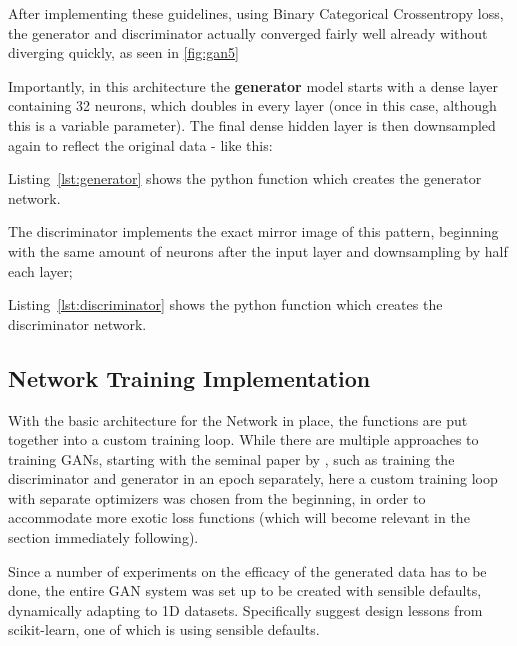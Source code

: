 \clearpage

After implementing these guidelines, using Binary Categorical Crossentropy loss, the generator and discriminator actually converged fairly well already without diverging quickly, as seen in \ref{fig:gan5}


Importantly, in this architecture the \textbf{generator} model starts with a dense layer containing 32 neurons, which doubles in every layer (once in this case, although this is a variable parameter). The final dense hidden layer is then downsampled again to reflect the original data - like this:


Listing~\ref{lst:generator} shows the python function which creates the generator network.

\pagebreak 

The discriminator implements the exact mirror image of this pattern, beginning with the same amount of neurons after the input layer and downsampling by half each layer; 


Listing~\ref{lst:discriminator} shows the python function which creates the discriminator network.

\pagebreak 

\subsection{Network Training Implementation}
\label{subsection:training_loop}

With the basic architecture for the Network in place, the functions are put together into a custom training loop. While there are multiple approaches to training \acp{GAN}, starting with the seminal paper by \cite{goodfellow2014generative}, such as training the discriminator and generator in an epoch separately, here a custom training loop with separate optimizers was chosen from the beginning, in order to accommodate more exotic loss functions (which will become relevant in the section immediately following).

Since a number of experiments on the efficacy of the generated data has to be done, the entire \ac{GAN} system was set up to be created with sensible defaults, dynamically adapting to 1D datasets. 
Specifically \cite{buitinck2013api} suggest design lessons from scikit-learn, one of which is using sensible defaults.

